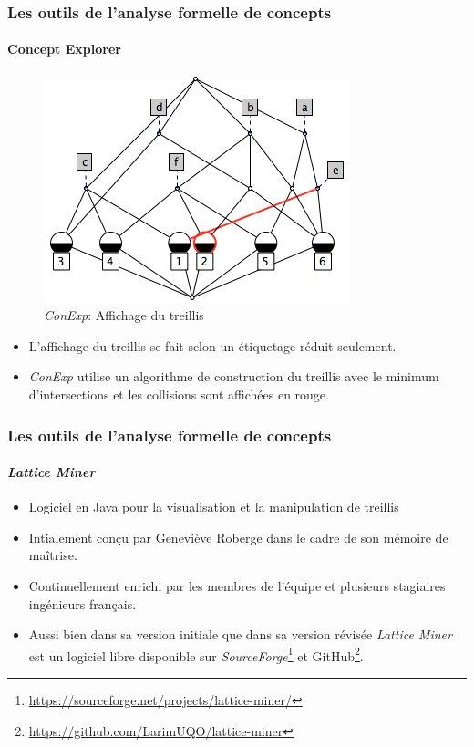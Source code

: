 \documentclass[french]{beamer}
\newcommand{\lm}{\emph{Lattice Miner}\xspace}
\begin{document}
\begin{frame}
\frametitle{Les outils de l'analyse formelle de concepts}
\framesubtitle{Concept Explorer}
\begin{figure}[H]
\begin{center}\includegraphics[scale=0.45]{figures/conexp-lattice.png}\end{center}
\caption{\emph{ConExp}: Affichage du treillis}
\label{cap:fig:conexp-lattice}
\end{figure}
\begin{itemize}
\item L'affichage du treillis se fait selon un étiquetage réduit seulement.
\item \emph{ConExp} utilise un algorithme de construction du treillis avec le minimum d'intersections et les collisions sont affichées en rouge.
\end{itemize}
\end{frame}
\begin{frame}
\frametitle{Les outils de l'analyse formelle de concepts}
\framesubtitle{\lm}
\begin{itemize}
\item Logiciel en Java pour la visualisation et la manipulation de treillis
\item Intialement conçu par Geneviève Roberge dans le cadre de son mémoire de maîtrise.
\item Continuellement enrichi par les membres de l'équipe et plusieurs stagiaires ingénieurs français.
\item Aussi bien dans sa version initiale que dans sa version révisée \lm est un logiciel libre disponible sur \emph{SourceForge}\footnote{\url{https://sourceforge.net/projects/lattice-miner/}} et GitHub\footnote{\url{https://github.com/LarimUQO/lattice-miner}}.
\end{itemize}
\end{frame}
\end{document}
